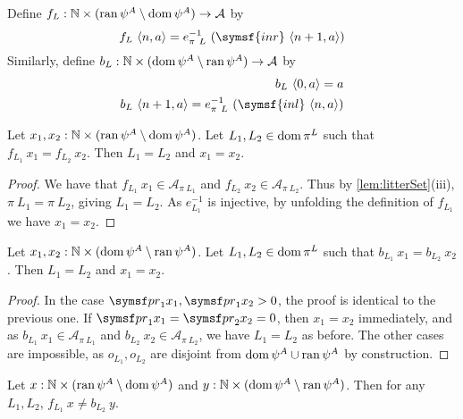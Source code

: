 \begin{definition}
    Define \( f_L : \mathbb N \times (\operatorname{ran} \psi^A \setminus \operatorname{dom} \psi^A) \to \mathcal A \) by
    \[ f_L\ \langle n, a \rangle = e_{\pi\ L}^{-1}\ (\symsf{inr}\ \langle n + 1, a \rangle) \]
    Similarly, define \( b_L : \mathbb N \times (\operatorname{dom} \psi^A \setminus \operatorname{ran} \psi^A) \to \mathcal A \) by
    \begin{align*}
        b_L\ \langle 0, a \rangle = a \\
        b_L\ \langle n + 1, a \rangle = e_{\pi\ L}^{-1}\ (\symsf{inl}\ \langle n, a \rangle)
    \end{align*}
\end{definition}
\begin{lemma}
    \label{cref:FillAtomOrbits.forward_injective}
    Let \( x_1, x_2 : \mathbb N \times (\operatorname{ran} \psi^A \setminus \operatorname{dom} \psi^A) \).
    Let \( L_1, L_2 \in \operatorname{dom} \pi^L \) such that \( f_{L_1}\ x_1 = f_{L_2}\ x_2 \).
    Then \( L_1 = L_2 \) and \( x_1 = x_2 \).
\end{lemma}
\begin{proof}
    We have that \( f_{L_1}\ x_1 \in \mathcal A_{\pi\ L_1} \) and \( f_{L_2}\ x_2 \in \mathcal A_{\pi\ L_2} \).
    Thus by \cref{lem:litterSet}(iii), \( \pi\ L_1 = \pi\ L_2 \), giving \( L_1 = L_2 \).
    As \( e_{L_1}^{-1} \) is injective, by unfolding the definition of \( f_{L_1} \) we have \( x_1 = x_2 \).
\end{proof}
\begin{lemma}
    \label{cref:FillAtomOrbits.backward_injective}
    Let \( x_1, x_2 : \mathbb N \times (\operatorname{dom} \psi^A \setminus \operatorname{ran} \psi^A) \).
    Let \( L_1, L_2 \in \operatorname{dom} \pi^L \) such that \( b_{L_1}\ x_1 = b_{L_2}\ x_2 \).
    Then \( L_1 = L_2 \) and \( x_1 = x_2 \).
\end{lemma}
\begin{proof}
    In the case \( \pr_1 x_1, \pr_1 x_2 > 0 \), the proof is identical to the previous one.
    If \( \pr_1 x_1 = \pr_2 x_2 = 0 \), then \( x_1 = x_2 \) immediately, and as \( b_{L_1}\ x_1 \in \mathcal A_{\pi\ L_1} \) and \( b_{L_2}\ x_2 \in \mathcal A_{\pi\ L_2} \), we have \( L_1 = L_2 \) as before.
    The other cases are impossible, as \( o_{L_1}, o_{L_2} \) are disjoint from \( \operatorname{dom} \psi^A \cup \operatorname{ran} \psi^A \) by construction.
\end{proof}
\begin{lemma}
    \label{lem:forward_ne_backward}
    Let \( x : \mathbb N \times (\operatorname{ran} \psi^A \setminus \operatorname{dom} \psi^A) \) and \( y : \mathbb N \times (\operatorname{dom} \psi^A \setminus \operatorname{ran} \psi^A) \).
    Then for any \( L_1, L_2 \), \( f_{L_1}\ x \neq b_{L_2}\ y \).
\end{lemma}
